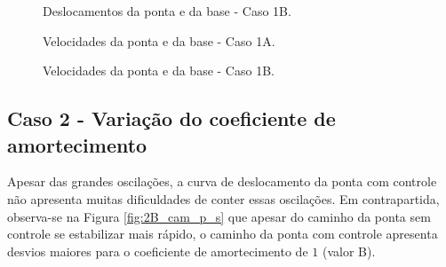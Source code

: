 
\begin{figure}[H]
    \centering
    \hfill
    \caption{Deslocamentos da ponta e da base - Caso 1B.}
    \label{fig:1B_des}
\end{figure}


\begin{figure}[H]
    \centering
    \hfill
    \caption{Velocidades da ponta e da base - Caso 1A.}
    \label{fig:1A_vel}
\end{figure}


\begin{figure}[H]
    \centering
    \hfill
    \caption{Velocidades da ponta e da base - Caso 1B.}
    \label{fig:1B_vel}
\end{figure}


\subsection{Caso 2 - Variação do coeficiente de amortecimento}


Apesar das grandes oscilações, a curva de deslocamento da ponta com controle não apresenta muitas dificuldades de conter essas oscilações. Em contrapartida, observa-se na Figura \ref{fig:2B_cam_p_s} que apesar do caminho da ponta sem controle se estabilizar mais rápido, o caminho da ponta com controle apresenta desvios maiores para o coeficiente de amortecimento de \(1\) (valor B).

